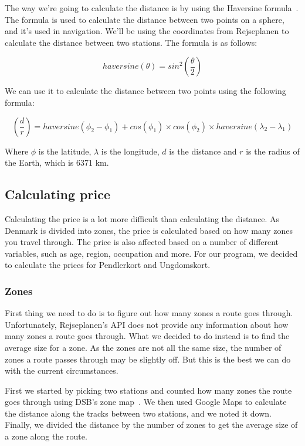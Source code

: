 The way we're going to calculate the distance is by using the Haversine formula~\cite{haversine}.
The formula is used to calculate the distance between two points on a sphere, and it's used in navigation.
We'll be using the coordinates from Rejseplanen to calculate the distance between two stations.
The formula is as follows:

\begin{equation}
    haversine(\theta) = sin^{2}(\frac{\theta}{2})
\end{equation}

We can use it to calculate the distance between two points using the following formula:

\begin{equation}
    (\frac{d}{r}) = haversine(\phi_{2} - \phi_{1}) + cos(\phi_{1}) \times cos(\phi_{2}) \times haversine(\lambda_{2} - \lambda_{1})
\end{equation}

Where $\phi$ is the latitude, $\lambda$ is the longitude, $d$ is the distance and $r$ is the radius of the Earth,
which is 6371 km.

\subsection{Calculating price}\label{subsec:calculating-price}

Calculating the price is a lot more difficult than calculating the distance.
As Denmark is divided into zones, the price is calculated based on how many zones you travel through.
The price is also affected based on a number of different variables, such as age, region, occupation and more.
For our program, we decided to calculate the prices for Pendlerkort and Ungdomskort.

\subsubsection{Zones}

First thing we need to do is to figure out how many zones a route goes through.
Unfortunately, Rejseplanen's API does not provide any information about how many zones a route goes through.
What we decided to do instead is to find the average size for a zone.
As the zones are not all the same size, the number of zones a route passes through may be slightly off.
But this is the best we can do with the current circumstances.

First we started by picking two stations and counted how many zones the route goes through using DSB's zone
map~\cite{price_zones}.
We then used Google Maps to calculate the distance along the tracks between two stations, and we noted it down.
Finally, we divided the distance by the number of zones to get the average size of a zone along the route.

